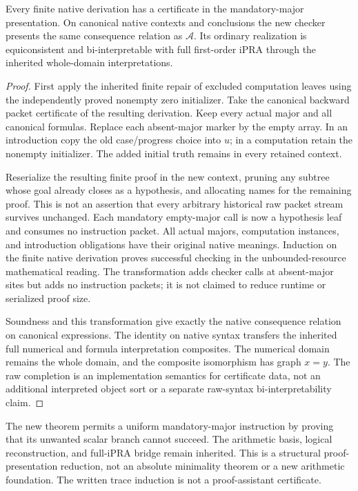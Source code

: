 \begin{theorem}
Every finite native derivation has a certificate in the mandatory-major
presentation.  On canonical native contexts and conclusions the new
checker presents the same consequence relation as $\mathcal A$.
Its ordinary realization is equiconsistent and bi-interpretable with
full first-order iPRA through the inherited whole-domain interpretations.
\end{theorem}
\begin{proof}
First apply the inherited finite repair of excluded computation leaves
using the independently proved nonempty zero initializer.  Take the
canonical backward packet certificate of the resulting derivation.
Keep every actual major and all canonical formulas. Replace each
absent-major marker by the empty array.  In an introduction copy the old
case/progress choice into $u$; in a computation retain the nonempty
initializer.  The added initial truth remains in every retained context.

Reserialize the resulting finite proof in the new context, pruning
any subtree whose goal already closes as a hypothesis, and allocating
names for the remaining proof. This is not an assertion
that every arbitrary historical raw packet stream survives unchanged.
Each mandatory empty-major call is now a hypothesis leaf and consumes
no instruction packet.  All actual majors, computation instances, and
introduction obligations have their original native meanings.  Induction
on the finite native derivation proves successful checking in the
unbounded-resource mathematical reading.  The transformation adds
checker calls at absent-major sites but adds no instruction packets;
it is not claimed to reduce runtime or serialized proof size.

Soundness and this transformation give exactly the native consequence
relation on canonical expressions.  The identity on native syntax
transfers the inherited full numerical and formula interpretation
composites.  The numerical domain remains the whole domain, and the
composite isomorphism has graph $x=y$.  The raw completion is an
implementation semantics for certificate data, not an additional
interpreted object sort or a separate raw-syntax bi-interpretability
claim.
\end{proof}

The new theorem permits a uniform mandatory-major instruction by proving
that its unwanted scalar branch cannot succeed.  The arithmetic basis,
logical reconstruction, and full-iPRA bridge remain inherited.  This is a
structural proof-presentation reduction, not an absolute minimality
theorem or a new arithmetic foundation.  The written trace induction is
not a proof-assistant certificate.
